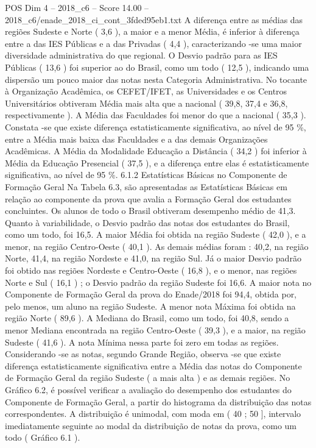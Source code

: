 \begin{textsample}{POS Dim 4 – 2018\_c6 – Score 14.00 – 2018\_c6/enade\_2018\_ci\_cont\_3fded95eb1.txt}
A diferença entre as médias das regiões Sudeste e Norte ( 3,6 ), a maior e a menor Média, é inferior à diferença entre a das IES Públicas e a das Privadas ( 4,4 ), caracterizando -se uma maior diversidade administrativa do que regional.
O Desvio padrão para as IES Públicas ( 13,6 ) foi superior ao do Brasil, como um todo ( 12,5 ), indicando uma dispersão um pouco maior das notas nesta Categoria Administrativa.
No tocante à Organização Acadêmica, os CEFET/IFET, as Universidades e os Centros Universitários obtiveram Média mais alta que a nacional ( 39,8, 37,4 e 36,8, respectivamente ).
A Média das Faculdades foi menor do que a nacional ( 35,3 ).
Constata -se que existe diferença estatisticamente significativa, ao nível de 95 \%, entre a Média mais baixa das Faculdades e a das demais Organizações Acadêmicas.
A Média da Modalidade Educação a Distância ( 34,2 ) foi inferior à Média da Educação Presencial ( 37,5 ), e a diferença entre elas é estatisticamente significativa, ao nível de 95 \%. 6.1.2 Estatísticas Básicas no Componente de Formação Geral Na Tabela 6.3, são apresentadas as Estatísticas Básicas em relação ao componente da prova que avalia a Formação Geral dos estudantes concluintes.
Os alunos de todo o Brasil obtiveram desempenho médio de 41,3.
Quanto à variabilidade, o Desvio padrão das notas dos estudantes do Brasil, como um todo, foi 16,5.
A maior Média foi obtida na região Sudeste ( 42,0 ), e a menor, na região Centro-Oeste ( 40,1 ).
As demais médias foram : 40,2, na região Norte, 41,4, na região Nordeste e 41,0, na região Sul.
Já o maior Desvio padrão foi obtido nas regiões Nordeste e Centro-Oeste ( 16,8 ), e o menor, nas regiões Norte e Sul ( 16,1 ) ; o Desvio padrão da região Sudeste foi 16,6.
A maior nota no Componente de Formação Geral da prova do Enade/2018 foi 94,4, obtida por, pelo menos, um aluno na região Sudeste.
A menor nota Máxima foi obtida na região Norte ( 89,6 ).
A Mediana do Brasil, como um todo, foi 40,8, sendo a menor Mediana encontrada na região Centro-Oeste ( 39,3 ), e a maior, na região Sudeste ( 41,6 ).
A nota Mínima nessa parte foi zero em todas as regiões.
Considerando -se as notas, segundo Grande Região, observa -se que existe diferença estatisticamente significativa entre a Média das notas do Componente de Formação Geral da região Sudeste ( a mais alta ) e as demais regiões.
No Gráfico 6.2, é possível verificar a avaliação do desempenho dos estudantes do Componente de Formação Geral, a partir do histograma da distribuição das notas correspondentes.
A distribuição é unimodal, com moda em ( 40 ; 50 ], intervalo imediatamente seguinte ao modal da distribuição de notas da prova, como um todo ( Gráfico 6.1 ).

\end{textsample}
